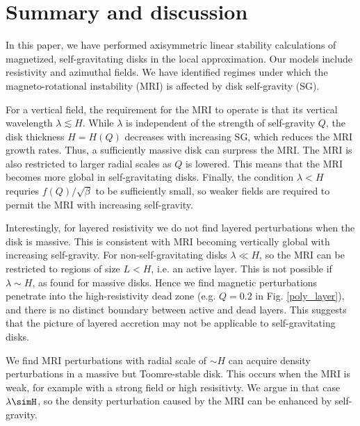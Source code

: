 \section{Summary and discussion}\label{summary}
In this paper, we have performed axisymmetric linear stability
calculations of magnetized, self-gravitating disks in the local
approximation. Our models include resistivity and azimuthal fields.  
We have identified regimes under which the magneto-rotational
instability (MRI) is affected by disk self-gravity (SG).  

For a vertical field, the requirement for the MRI to operate is that its
vertical wavelength $\lambda \lesssim H$. While $\lambda$ is independent of
the strength of self-gravity $Q$, the disk thickness $H=H(Q)$ %
decreases with increasing SG, which reduces the MRI growth rates.   
Thus, a sufficiently massive disk can surpress the MRI. %
The MRI is also restricted to larger radial
scales as $Q$ is lowered. This means that the MRI becomes more global
in self-gravitating disks. Finally, the condition $\lambda < H$ 
requries $f(Q)/\sqrt{\beta}$ to be sufficiently small, so weaker
fields are required to permit the MRI with increasing self-gravity.   
 


Interestingly, for layered resistivity we do not find layered
perturbations when the disk is massive. This is 
consistent with MRI becoming vertically global with increasing self-gravity.    
For non-self-gravitating disks $\lambda\ll H$, so the MRI can be
restricted to regions of size $L<H$, i.e. an active layer. This is not
possible if $\lambda \sim H$, as found for massive disks. Hence we
find magnetic perturbations penetrate into the high-resistivity dead
zone (e.g. $Q=0.2$ in Fig. \ref{poly_layer}), and there is no distinct
boundary between active and dead layers. This suggests that the
picture of layered accretion  \citep[e.g.][]{fleming03} may not be applicable 
to self-gravitating disks.  %


We find MRI perturbations with radial scale of $\sim H$ can acquire  
density perturbations in a massive but Toomre-stable disk. 
This occurs when the MRI is weak, for example with a strong field or
high resisitivty. We argue in that case $\lambda\simH$, so the density
perturbation caused by the MRI can be enhanced by self-gravity. 

